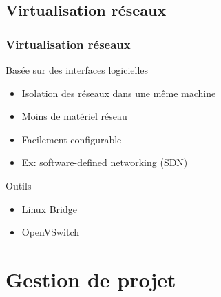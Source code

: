 \documentclass{beamer}
\begin{document}
		\subsection{Virtualisation réseaux}
			\begin{frame}
			  \frametitle{Virtualisation réseaux}
			  Basée sur des interfaces logicielles
			  \begin{itemize}
				    \item Isolation des réseaux dans une même machine
				    \item Moins de matériel réseau
				    \item Facilement configurable
				    \item Ex: software-defined networking (SDN)
				\end{itemize}
				\begin{block}{Outils}
				  \begin{itemize}
				      \item Linux Bridge
				      \item OpenVSwitch
				  \end{itemize}
				\end{block}
			\end{frame}
			
			
	\section{Gestion de projet}
	
\end{document}
